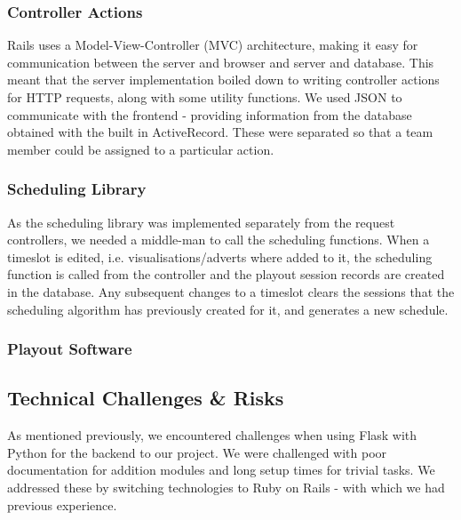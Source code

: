 \documentclass[a4paper, titlepage]{article}
\begin{document}
\subsubsection{Controller Actions}

Rails uses a Model-View-Controller (MVC) architecture, making it easy for communication between the 
server and browser and server and database. This meant that the server implementation boiled down to
writing controller actions for HTTP requests, along with some utility functions. We used JSON to 
communicate with the frontend - providing information from the database obtained with the built in 
ActiveRecord. These were separated so that a team member could be assigned to a particular action.   



\subsubsection{Scheduling Library}


As the scheduling library was implemented separately from the request controllers,
we needed a middle-man to call the scheduling functions. When a timeslot is edited, i.e. 
visualisations/adverts where added to it, the scheduling function is called from
the controller and the playout session records are created in the database. Any 
subsequent changes to a timeslot clears the sessions that the scheduling algorithm 
has previously created for it, and generates a new schedule. 

\subsubsection{Playout Software}




\subsection{Technical Challenges \& Risks}
As mentioned previously, we encountered challenges when using Flask with Python for the backend to our 
project. We were challenged with poor documentation for addition modules and long setup times for 
trivial tasks. We addressed these by switching technologies to Ruby on Rails - with which we had 
previous experience. 
\end{document}

